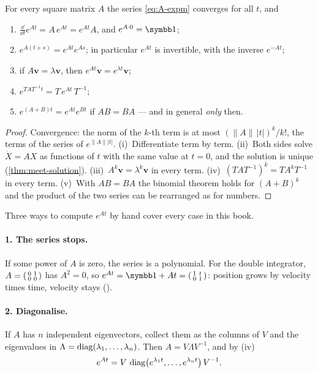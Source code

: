 \begin{theorem}
\label{thm:A-expm}
For every square matrix $A$ the series \eqref{eq:A-expm} converges for all $t$, and
\begin{enumerate}[label=(\roman*)]
  \item $\frac{\dd}{\dd t}e^{At} = A\,e^{At} = e^{At}A$, and $e^{A\cdot 0} = \Id$;
  \item $e^{A(t + s)} = e^{At}e^{As}$; in particular $e^{At}$ is invertible, with the inverse $e^{-At}$;
  \item if $A\symbf v = \lambda\symbf v$, then $e^{At}\symbf v = e^{\lambda t}\symbf v$;
  \item $e^{TAT^{-1}t} = T\,e^{At}\,T^{-1}$;
  \item $e^{(A + B)t} = e^{At}e^{Bt}$ if $AB = BA$ — and in general \emph{only} then.
\end{enumerate}
\end{theorem}
\begin{proof}
Convergence: the norm of the $k$-th term is at most $(\|A\|\,|t|)^k/k!$, the terms of the series of $e^{\|A\||t|}$. (i)~Differentiate term by term. (ii)~Both sides solve $\dot X = AX$ as functions of $t$ with the same value at $t = 0$, and the solution is unique (\cref{thm:meet-solution}). (iii)~$A^k\symbf v = \lambda^k\symbf v$ in every term. (iv)~$(TAT^{-1})^k = TA^kT^{-1}$ in every term. (v)~With $AB = BA$ the binomial theorem holds for $(A + B)^k$ and the product of the two series can be rearranged as for numbers.
\end{proof}

Three ways to compute $e^{At}$ by hand cover every case in this book.

\paragraph{1. The series stops.} If some power of $A$ is zero, the series is a polynomial. For the double integrator, $A = \begin{psmallmatrix}0 & 1\\ 0 & 0\end{psmallmatrix}$ has $A^2 = 0$, so $e^{At} = \Id + At = \begin{psmallmatrix}1 & t\\ 0 & 1\end{psmallmatrix}$: position grows by velocity times time, velocity stays ().

\paragraph{2. Diagonalise.} If $A$ has $n$ independent eigenvectors, collect them as the columns of $V$ and the eigenvalues in $\Lambda = \operatorname{diag}(\lambda_1, \dots, \lambda_n)$. Then $A = V\Lambda V^{-1}$, and by (iv)
\begin{equation}\label{eq:A-diag}
  e^{At} = V\,\operatorname{diag}\!\big(e^{\lambda_1 t}, \dots, e^{\lambda_n t}\big)\,V^{-1} .
\end{equation}

